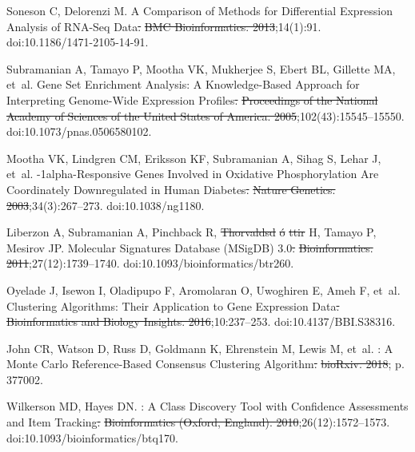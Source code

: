 \documentclass[10pt,letterpaper]{article}
\providecommand{\DIFaddtex}[1]{{\protect\color{blue}\uwave{#1}}} %
\providecommand{\DIFdeltex}[1]{{\protect\color{red}\sout{#1}}}                      %
\providecommand{\DIFaddbegin}{} %
\providecommand{\DIFaddend}{} %
\providecommand{\DIFdelbegin}{} %
\providecommand{\DIFdelend}{} %
\providecommand{\DIFadd}[1]{\texorpdfstring{\DIFaddtex{#1}}{#1}} %
\providecommand{\DIFdel}[1]{\texorpdfstring{\DIFdeltex{#1}}{}} %
\newcommand{\DIFscaledelfig}{0.5}
\newlength{\DIFdelgraphicswidth} %
\newlength{\DIFdelgraphicsheight} %
\newcommand{\DIFaddincludegraphics}[2][]{{\color{blue}\fbox{\DIFOincludegraphics[#1]{#2}}}} %
\newcommand{\DIFdelincludegraphics}[2][]{%
\sbox{\DIFdelgraphicsbox}{\DIFOincludegraphics[#1]{#2}}%
\settoboxwidth{\DIFdelgraphicswidth}{\DIFdelgraphicsbox} %
\settoboxtotalheight{\DIFdelgraphicsheight}{\DIFdelgraphicsbox} %
\scalebox{\DIFscaledelfig}{%
\parbox[b]{\DIFdelgraphicswidth}{\usebox{\DIFdelgraphicsbox}\\[-\baselineskip] \rule{\DIFdelgraphicswidth}{0em}}\llap{\resizebox{\DIFdelgraphicswidth}{\DIFdelgraphicsheight}{%
\setlength{\unitlength}{\DIFdelgraphicswidth}%
\begin{picture}(1,1)%
\thicklines\linethickness{2pt} %
{\color[rgb]{1,0,0}\put(0,0){\framebox(1,1){}}}%
{\color[rgb]{1,0,0}\put(0,0){\line( 1,1){1}}}%
{\color[rgb]{1,0,0}\put(0,1){\line(1,-1){1}}}%
\end{picture}%
}\hspace*{3pt}}} %
} %
\DeclareRobustCommand{\DIFaddbegin}{\DIFOaddbegin \let\includegraphics\DIFaddincludegraphics} %
\DeclareRobustCommand{\DIFaddend}{\DIFOaddend \let\includegraphics\DIFOincludegraphics} %
\DeclareRobustCommand{\DIFdelbegin}{\DIFOdelbegin \let\includegraphics\DIFdelincludegraphics} %
\DeclareRobustCommand{\DIFdelend}{\DIFOaddend \let\includegraphics\DIFOincludegraphics} %
\begin{document}
\begin{thebibliography}{10}
	Soneson C, Delorenzi M.
	\newblock A Comparison of Methods for Differential Expression Analysis of
	{{RNA}}-Seq Data\DIFdelbegin \DIFdel{.
	}%
\DIFdel{BMC Bioinformatics. 2013}\DIFdelend ;14(1):91.
	\newblock doi:{10.1186/1471-2105-14-91}.

	Subramanian A, Tamayo P, Mootha VK, Mukherjee S, Ebert BL, Gillette MA, et~al.
	\newblock Gene Set Enrichment Analysis: A Knowledge-Based Approach for
	Interpreting Genome-Wide Expression Profiles\DIFdelbegin \DIFdel{.
	}%
\DIFdel{Proceedings of the National Academy of Sciences of the United States
	of America. 2005}\DIFdelend ;102(43):15545--15550.
	\newblock doi:{10.1073/pnas.0506580102}.

	Mootha VK, Lindgren CM, Eriksson KF, Subramanian A, Sihag S, Lehar J, et~al.
	-1alpha-Responsive Genes Involved in Oxidative Phosphorylation
	Are Coordinately Downregulated in Human Diabetes\DIFdelbegin \DIFdel{.
	}%
\DIFdel{Nature Genetics. 2003}\DIFdelend ;34(3):267--273.
	\newblock doi:{10.1038/ng1180}.

	Liberzon A, Subramanian A, Pinchback R, \DIFdelbegin \DIFdel{Thorvaldsd}%
\DIFdel{\'o}%
\DIFdel{ttir }\DIFdelend \DIFaddbegin \DIFadd{Thorvaldsdóttir }\DIFaddend H, Tamayo P, Mesirov
	JP.
	\newblock Molecular Signatures Database ({{MSigDB}}) 3.0\DIFdelbegin \DIFdel{.
	}%
\DIFdel{Bioinformatics. 2011}\DIFdelend ;27(12):1739--1740.
	\newblock doi:{10.1093/bioinformatics/btr260}.

	Oyelade J, Isewon I, Oladipupo F, Aromolaran O, Uwoghiren E, Ameh F, et~al.
	\newblock Clustering {{Algorithms}}: {{Their Application}} to {{Gene Expression
			Data}}\DIFdelbegin \DIFdel{.
	}%
\DIFdel{Bioinformatics and Biology Insights. 2016}\DIFdelend ;10:237--253.
	\newblock doi:{10.4137/BBI.S38316}.

	John CR, Watson D, Russ D, Goldmann K, Ehrenstein M, Lewis M, et~al.
	: {{A Monte Carlo}} Reference-Based Consensus Clustering
	Algorithm\DIFdelbegin \DIFdel{.
	}%
\DIFdel{bioRxiv. 2018}\DIFdelend ; p. 377002.

	Wilkerson MD, Hayes DN.
	: A Class Discovery Tool with Confidence
	Assessments and Item Tracking\DIFdelbegin \DIFdel{.
	}%
\DIFdel{Bioinformatics (Oxford, England). 2010}\DIFdelend ;26(12):1572--1573.
	\newblock doi:{10.1093/bioinformatics/btq170}.


\end{thebibliography}
\end{document}
